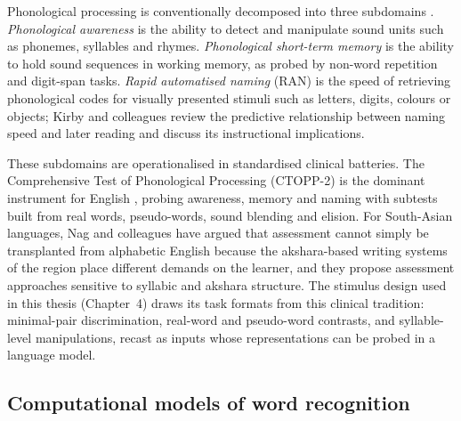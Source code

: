 Phonological processing is conventionally decomposed into three subdomains \cite{wagner2013ctopp,kirby2010ran,wagner1987nature}. \emph{Phonological awareness} is the ability to detect and manipulate sound units such as phonemes, syllables and rhymes. \emph{Phonological short-term memory} is the ability to hold sound sequences in working memory, as probed by non-word repetition and digit-span tasks. \emph{Rapid automatised naming} (RAN) is the speed of retrieving phonological codes for visually presented stimuli such as letters, digits, colours or objects; Kirby and colleagues \cite{kirby2010ran} review the predictive relationship between naming speed and later reading and discuss its instructional implications.

These subdomains are operationalised in standardised clinical batteries. The Comprehensive Test of Phonological Processing (CTOPP-2) is the dominant instrument for English \cite{wagner2013ctopp}, probing awareness, memory and naming with subtests built from real words, pseudo-words, sound blending and elision. For South-Asian languages, Nag and colleagues \cite{nag2014dyslexia,nag2017indian} have argued that assessment cannot simply be transplanted from alphabetic English because the akshara-based writing systems of the region place different demands on the learner, and they propose assessment approaches sensitive to syllabic and akshara structure. The stimulus design used in this thesis (Chapter~4) draws its task formats from this clinical tradition: minimal-pair discrimination, real-word and pseudo-word contrasts, and syllable-level manipulations, recast as inputs whose representations can be probed in a language model.

\subsection{Computational models of word recognition}


